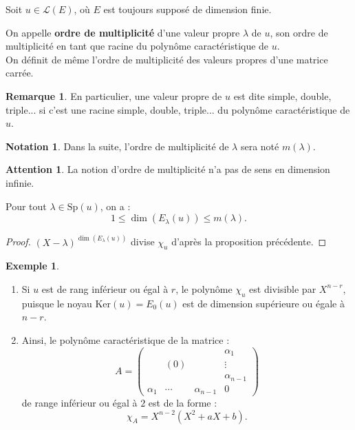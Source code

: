 \documentclass[french]{article}
\renewcommand{\ker}{\text{Ker}}
\newcommand{\Sp}{\text{Sp}}
\theoremstyle{plain}
\theoremstyle{definition}
\newtheorem*{ex}{Exemple}
\newtheorem*{rmq}{Remarque}
\newtheorem*{notation}{Notation}
\newtheorem*{attention}{Attention}
\theoremstyle{remark}
\begin{document}
	Soit $u\in\mathcal{L}(E)$, où $E$ est toujours supposé de dimension finie.
	
	\begin{dfn}
		On appelle \textbf{ordre de multiplicité} d'une valeur propre $\lambda$ de $u$, son ordre de multiplicité en tant que racine du polynôme caractéristique de $u$.\\
		On définit de même l'ordre de multiplicité des valeurs propres d'une matrice carrée.
	\end{dfn}
	
	\begin{rmq}
		En particulier, une valeur propre de $u$ est dite simple, double, triple... si c'est une racine simple, double, triple... du polynôme caractéristique de $u$.
	\end{rmq}
	
	\begin{notation}
		Dans la suite, l'ordre de multiplicité de $\lambda$ sera noté $m(\lambda)$.
	\end{notation}
	
	\begin{attention}
		La notion d'ordre de multiplicité n'a pas de sens en dimension infinie.
	\end{attention}
	
	\begin{prop}{}%
		Pour tout $\lambda\in\Sp(u)$, on a : $$1\leqslant\dim(E_\lambda(u))\leqslant m(\lambda).$$
	\end{prop}
	\begin{proof}
		$(X-\lambda)^{\dim(E_\lambda(u))}$ divise $\chi_u$ d'après la proposition précédente.
	\end{proof}
	
	\begin{ex}
		\begin{enumerate}
			\item Si $u$ est de rang inférieur ou égal à $r$, le polynôme $\chi_u$ est divisible par $X^{n-r}$, puisque le noyau $\ker(u)=E_0(u)$ est de dimension supérieure ou égale à $n-r$.
			\item Ainsi, le polynôme caractéristique de la matrice : 
			$$A=\begin{pmatrix}
				&&&\alpha_1\\
				&(0)&&\vdots\\
				&&&\alpha_{n-1}\\
				\alpha_1&\cdots&\alpha_{n-1}&0
			\end{pmatrix}$$ de range inférieur ou égal à $2$ est de la forme : $$\chi_A=X^{n-2}(X^2+aX+b).$$
		\end{enumerate}
	\end{ex}
	
\end{document}
